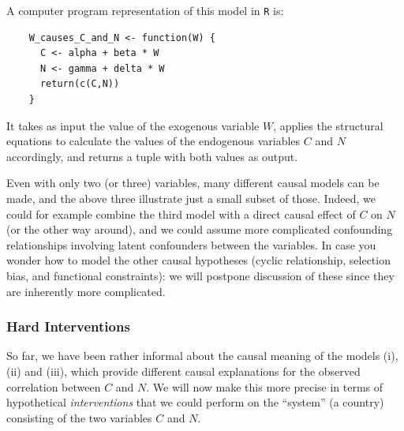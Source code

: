 \begin{enumerate}[label=(\roman*)]
    A computer program representation of this model in \texttt{R} is:
    \begin{lstlisting}
    W_causes_C_and_N <- function(W) {
      C <- alpha + beta * W
      N <- gamma + delta * W
      return(c(C,N))
    }
    \end{lstlisting}
    It takes as input the value of the exogenous variable $W$, applies the structural equations to calculate the values of the endogenous variables $C$ and $N$ accordingly, and returns a tuple with both values as output.
\end{enumerate}
Even with only two (or three) variables, many different causal models can be made, and the above three illustrate just a small subset of those. Indeed, we could for example combine the third model with a direct causal effect of $C$ on $N$ (or the other way around), and we could assume more complicated confounding relationships involving latent confounders between the variables.
In case you wonder how to model the other causal hypotheses (cyclic relationship, selection bias, and functional constraints):
we will postpone discussion of these since they are inherently more complicated.

\subsubsection{Hard Interventions}

So far, we have been rather informal about the causal meaning of the models (i), (ii) and (iii), which provide different causal explanations for the observed correlation between $C$ and $N$. 
We will now make this more precise in terms of hypothetical \emph{interventions} that we could perform on the ``system'' (a country) consisting of the two variables $C$ and $N$.

